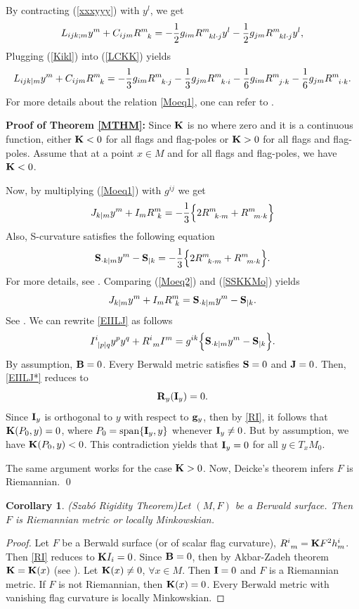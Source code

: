 \documentclass[12pt,a4paper]{article}
\newtheorem{cor}{Corollary}[section]
\theoremstyle{definition}
\newcommand{\be}{\begin{equation}}
\newcommand{\ee}{\end{equation}}
\numberwithin{equation}{section}
\begin{document}
By contracting (\ref{xxxyyy}) with $y^l$, we get
\be
L_{ijk;m}y^m + C_{ijm}R^m_{\ \ k}
= - {1\over 2} g_{im} R^m_{\ \ kl\cdot j} y^l - {1\over 2} g_{jm} R^m_{\ \ kl\cdot j} y^l,\label{LCKK}
\ee
Plugging (\ref{Kikl}) into (\ref{LCKK}) yields
\begin{eqnarray}
L_{ijk|m}y^m + C_{ijm}R^m_{\ \ k}=   - {1\over 3}g_{im}R^m_{\ \ k\cdot j}
- {1\over 3} g_{jm} R^m_{\ \ k\cdot i}- {1\over 6} g_{im}R^m_{\ \ j\cdot k}
- {1\over 6} g_{jm}R^m_{\ \ i\cdot k}. \label{Moeq1}
\end{eqnarray}
For more details about the relation \eqref{Moeq1}, one can refer to \cite{MS}.


\bigskip

\noindent
{\bf Proof of Theorem \ref{MTHM}:} Since $ {\bf K}$ is no where zero and it is a continuous function, either ${\bf K} <0$ for all flags and flag-poles or ${\bf K} >0$  for all flags and flag-poles.  Assume that at a point $x\in M$ and for all flags and flag-poles, we have ${\bf K} <0$.

Now, by multiplying (\ref{Moeq1}) with $g^{ij}$  we get
\be
J_{k|m}y^m + I_mR^m_{\ k}  = -  {1\over 3} \Big \{ 2 R^m_{\ \; k\cdot m} + R^m_{\ \; m\cdot k} \Big \} \label{Moeq2}
\ee
Also, S-curvature satisfies the following equation
\be
{\bf S}_{\cdot k|m}y^m - {\bf S}_{| k}
= - {1\over 3} \Big \{ 2 R^m_{\ \; k\cdot m} + R^m_{\ \; m\cdot k} \Big \}.\label{SSKKMo}
\ee
For more details, see \cite{CMS}. Comparing (\ref{Moeq2}) and (\ref{SSKKMo}) yields
\be
J_{k|m}y^m +I_m R^m_{\ k} = {\bf S}_{\cdot k|m}y^m - {\bf S}_{|k}. \label{EIILJ}
\ee
See \cite{Shn}. We can rewrite \eqref{EIILJ} as follows
\be
I^i_{\ | p|q} y^py^q +  R^i_{\ m}I^m = g^{ik} \Big \{ {\bf S}_{\cdot k|m}y^m - {\bf S}_{|k} \Big \}. \label{EIILJ*}
\ee
By assumption, ${\bf B}=0$. Every Berwald metric satisfies ${\bf S}=0$ and ${\bf J}=0$. Then, \eqref{EIILJ*} reduces to
\be
{\bf R}_y({\bf I}_y)=0. \label{RI}
\ee
Since ${\bf I}_y$ is orthogonal to $y$ with respect to ${\bf g}_y$, then by \eqref{RI}, it follows that  ${\bf K}(P_0, y)=0$, where
$P_0= {\rm span} \{{\bf I}_y, y\}$ whenever ${\bf I}_y \not=0$. But by assumption, we have ${\bf K}(P_0, y)<0$. This contradiction yields that   ${\bf I}_y =0$ for all $y\in T_xM_0$.

The same argument works for the case ${\bf K} > 0$. Now, Deicke's theorem infers $F$ is Riemannian.
\qed

\bigskip

\begin{cor}{\rm (Szab\'{o} Rigidity Theorem)}\label{CSZ}
Let $(M, F)$ be a Berwald surface. Then $F$ is Riemannian metric or locally Minkowskian.
\end{cor}
\begin{proof}
Let $F$ be a Berwald surface (or of scalar flag curvature), $R^i_{\ m}={\bf K}F^2h^i_m$. Then \eqref{RI} reduces to ${\bf K}I_i =0$. Since ${\bf B}=0$, then by Akbar-Zadeh theorem ${\bf K}={\bf K}(x)$ (see \cite{AZ}). Let  ${\bf K}(x)\neq 0$, $\forall x\in M$. Then ${\bf I}=0$ and $F$ is a Riemannian metric.  If $F$ is not Riemannian, then ${\bf K}(x)= 0$. Every Berwald metric with vanishing flag curvature is locally Minkowskian.
\end{proof}
\end{document}

